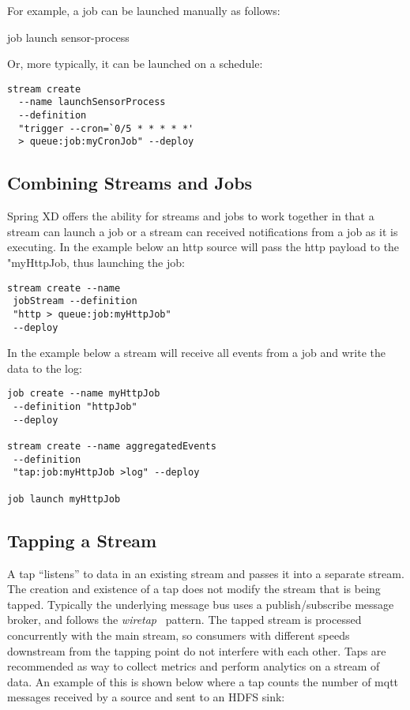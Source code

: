 For example, a job can be launched manually as follows:

job launch sensor-process

Or, more typically, it can be launched on a schedule:

\begin{lstlisting}
stream create
  --name launchSensorProcess
  --definition
  "trigger --cron=`0/5 * * * * *'
  > queue:job:myCronJob" --deploy
\end{lstlisting}

\subsection {Combining Streams and Jobs}

Spring XD offers the ability for streams and jobs to work together in that
a stream can launch a job or a stream can received notifications from a job
as it is executing.  In the example below an http source will pass the http
payload to the "myHttpJob, thus launching the job:

\begin{lstlisting}
stream create --name
 jobStream --definition
 "http > queue:job:myHttpJob"
 --deploy
\end{lstlisting}

In the example below a stream will receive all events from a job and write
the data to the log:

\begin{lstlisting}
job create --name myHttpJob
 --definition "httpJob"
 --deploy

stream create --name aggregatedEvents
 --definition
 "tap:job:myHttpJob >log" --deploy

job launch myHttpJob
\end{lstlisting}

\subsection {Tapping a Stream} \label{sssec:deploytap}

A tap ``listens'' to data in an existing stream and passes it into a separate
stream. The creation and existence of a tap does not modify the stream that
is being tapped. Typically the underlying message bus uses a publish/subscribe
message broker, and follows the \emph{wiretap}~\cite{wiretap}
pattern. The tapped stream is processed concurrently with the main stream, so
 consumers with different speeds downstream from the tapping point do not
 interfere with each other. Taps are recommended as way to collect metrics and perform
analytics on a stream of data. An example of this is shown below where a
tap counts the number of mqtt messages received by a source and sent to an
HDFS sink:

